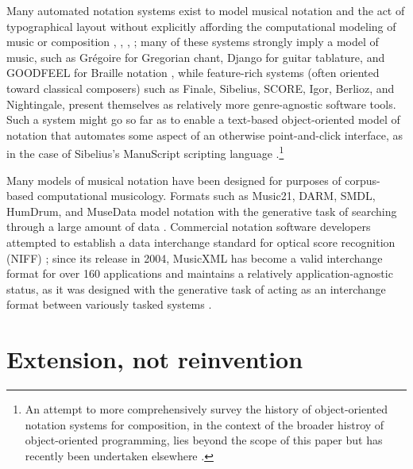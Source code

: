 \documentclass{article}
\begin{document}
Many automated notation systems exist to model musical notation and the act of
typographical layout without explicitly affording the computational modeling of
music or composition \cite{Smith:1972mw}, \cite{Nienhuys:2003ve},
\cite{Hoos:1998bd}, \cite{hamel1noteability}; many of these systems strongly
imply a model of music, such as Gr\'{e}goire for Gregorian chant, Django for
guitar tablature, and GOODFEEL for Braille notation \cite{2006}, while
feature-rich systems (often oriented toward classical composers) such as
Finale, Sibelius, SCORE, Igor, Berlioz, and Nightingale, present themselves as
relatively more genre-agnostic software tools. Such a system might go so far as
to enable a text-based object-oriented model of notation that automates some
aspect of an otherwise point-and-click interface, as in the case of Sibelius's
ManuScript scripting language \cite{Technology:qc}.\footnote{An attempt to
more comprehensively survey the history of object-oriented notation systems for
composition, in the context of the broader histroy of object-oriented programming,
lies beyond the scope of this paper but has recently been undertaken elsewhere
\cite{Trevino:2013aa}.}

Many models of musical notation have been designed for purposes of
corpus-based computational musicology. Formats such as Music21, DARM, SMDL,
HumDrum, and MuseData model notation with the generative task of searching
through a large amount of data \cite{Selfridge-Field:1997ud}. Commercial
notation software developers attempted to establish a data interchange standard
for optical score recognition (NIFF) \cite{niff1995niff}; since its release in
2004, MusicXML has become a valid interchange format for over 160 applications
and maintains a relatively application-agnostic status, as it was designed with
the generative task of acting as an interchange format between variously tasked
systems \cite{Good:2001if}.

\section{Extension, not reinvention} \label{sec:extension}
\end{document}
